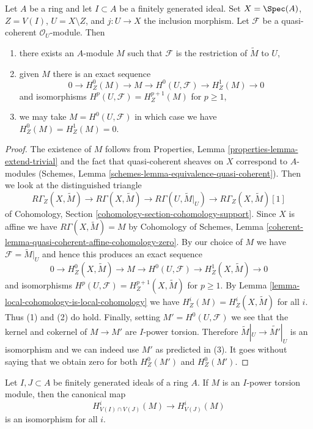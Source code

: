 \begin{lemma}
\label{lemma-local-cohomology}
Let $A$ be a ring and let $I \subset A$ be a finitely generated ideal.
Set $X = \Spec(A)$, $Z = V(I)$, $U = X \setminus Z$, and $j : U \to X$
the inclusion morphism. Let $\mathcal{F}$ be a quasi-coherent
$\mathcal{O}_U$-module. Then
\begin{enumerate}
\item there exists an $A$-module $M$ such that $\mathcal{F}$ is the
restriction of $\widetilde{M}$ to $U$,
\item given $M$ there is an exact sequence
$$
0 \to H^0_Z(M) \to M \to H^0(U, \mathcal{F}) \to H^1_Z(M) \to 0
$$
and isomorphisms $H^p(U, \mathcal{F}) = H^{p + 1}_Z(M)$ for $p \geq 1$,
\item we may take $M = H^0(U, \mathcal{F})$ in which case
we have $H^0_Z(M) = H^1_Z(M) = 0$.
\end{enumerate}
\end{lemma}

\begin{proof}
The existence of $M$ follows from
Properties, Lemma \ref{properties-lemma-extend-trivial}
and the fact that quasi-coherent sheaves on $X$ correspond
to $A$-modules (Schemes, Lemma \ref{schemes-lemma-equivalence-quasi-coherent}).
Then we look at the distinguished triangle
$$
R\Gamma_Z(X, \widetilde{M}) \to R\Gamma(X, \widetilde{M}) \to
R\Gamma(U, \widetilde{M}|_U) \to R\Gamma_Z(X, \widetilde{M})[1]
$$
of Cohomology, Section \ref{cohomology-section-cohomology-support}.
Since $X$ is affine we have $R\Gamma(X, \widetilde{M}) = M$
by Cohomology of Schemes, Lemma
\ref{coherent-lemma-quasi-coherent-affine-cohomology-zero}.
By our choice of $M$ we have $\mathcal{F} = \widetilde{M}|_U$
and hence this produces an exact sequence
$$
0 \to H^0_Z(X, \widetilde{M}) \to M \to H^0(U, \mathcal{F}) \to
H^1_Z(X, \widetilde{M}) \to 0
$$
and isomorphisms $H^p(U, \mathcal{F}) = H^{p + 1}_Z(X, \widetilde{M})$
for $p \geq 1$. By Lemma \ref{lemma-local-cohomology-is-local-cohomology}
we have $H^i_Z(M) = H^i_Z(X, \widetilde{M})$ for all $i$.
Thus (1) and (2) do hold.
Finally, setting $M' = H^0(U, \mathcal{F})$ we see that
the kernel and cokernel of $M \to M'$ are $I$-power torsion.
Therefore $\widetilde{M}|_U \to \widetilde{M'}|_U$ is an isomorphism
and we can indeed use $M'$ as predicted in (3). It goes without saying
that we obtain zero for both $H^0_Z(M')$ and $H^0_Z(M')$.
\end{proof}

\begin{lemma}
\label{lemma-already-torsion}
Let $I, J \subset A$ be finitely generated ideals of a ring $A$.
If $M$ is an $I$-power torsion module, then the
canonical map
$$
H^i_{V(I) \cap V(J)}(M) \to H^i_{V(J)}(M)
$$
is an isomorphism for all $i$.
\end{lemma}


